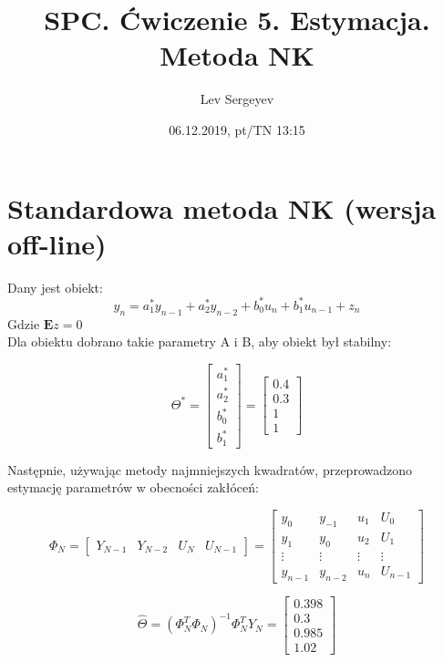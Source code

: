 \documentclass{article}
\author{Lev Sergeyev}
\title{SPC. Ćwiczenie 5. Estymacja. Metoda NK}
\date{06.12.2019, pt/TN 13:15}
\begin{document}
\maketitle



\section{Standardowa metoda NK (wersja off-line)}
\par
Dany jest obiekt:
\begin{equation}
y_n=a_1^* y_{n-1} + a_2^* y_{n-2} + b_0^* u_n + b_1^* u_{n-1} + z_n
\end{equation}
Gdzie \( \mathbf{E}z = 0  \) \\
Dla obiektu dobrano takie parametry A i B, aby obiekt był stabilny:

\begin{equation}
\Theta^* = \begin{bmatrix}
a_1^* \\ a_2^* \\ b_0^* \\ b_1^*
\end{bmatrix} = \begin{bmatrix}
0.4 \\ 0.3 \\ 1 \\ 1
\end{bmatrix}
\end{equation}

Następnie, używając metody najmniejszych kwadratów, przeprowadzono estymację parametrów w obecności zakłóceń:

\begin{equation}
\Phi_N = \begin{bmatrix}
Y_{N-1} & Y_{N-2} & U_N & U_{N-1}
\end{bmatrix}
 = \begin{bmatrix}
y_{0} & y_{-1} & u_1 & U_{0} \\ 
y_{1} & y_{0} & u_2 & U_{1} \\ 
\vdots & \vdots & \vdots & \vdots \\ 
y_{n-1} & y_{n-2} & u_n & U_{n-1} 
\end{bmatrix}
\end{equation}

\begin{equation}
\widehat{\Theta} = (\Phi_N^T \Phi_N)^{-1} \Phi_N^T Y_N = \begin{bmatrix}
0.398 \\  0.3 \\ 0.985 \\ 1.02
\end{bmatrix}
\end{equation}
\end{document}
